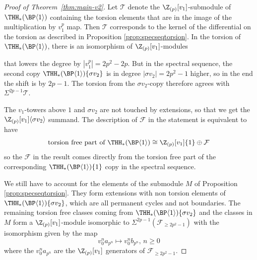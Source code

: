 \begin{proof}[Proof of Theorem~\ref{thm:main-v2}]
Let $\mathcal{T}$ denote the $\Z_{(p)}[v_1]$-submodule of $\THH_*(\BP \langle 1 \rangle)$ containing the torsion elements that are in the image of the multiplication by $v_1^p$ map. Then $\mathcal{T}$ corresponds to the kernel of the differential on the torsion as described in Proposition \ref{prop:specseqtorsion}. In the torsion of $\THH_*(\BP \langle 1 \rangle)$, there is an isomorphism of $\Z_{(p)}[v_1]$-modules
  \begin{center}
  \end{center}
  that lowers the degree by $|v_1^p| = 2p^2 - 2p$. But in the spectral sequence, the second copy $\THH_*(\BP \langle 1 \rangle)\{ \sigma v_2\}$ is in degree $|\sigma v_2| = 2p^2 - 1$ higher, so in the end the shift is by $2p -1$. The torsion from the $\sigma v_2$-copy therefore agrees with $\Sigma^{2p-1} \mathcal{T}$.

  The $v_1$-towers above $1$ and $\sigma v_2$ are not touched by extensions, so that we get the $\Z_{(p)}[v_1]\langle \sigma v_2 \rangle$ summand. The description of $\mathcal{F}$ in the statement is equivalent to have
  \[
    \text{torsion free part of } \THH_*(\BP \langle 1 \rangle) \cong \Z_{(p)}[v_1] \{1\} \oplus \mathcal{F}
  \]
  so the $\mathcal{F}$ in the result comes directly from the torsion free part of the corresponding $\THH_*(\BP \langle 1 \rangle)\{1\}$ copy in the spectral sequence.

  We still have to account for the elements of the submodule $M$ of Proposition \ref{prop:specseqtorsion}. They form extensions with non torsion elements of $\THH_*(\BP \langle 1 \rangle)\{ \sigma v_2\}$, which are all permanent cycles and not boundaries. The remaining torsion free classes coming from $\THH_*(\BP \langle 1 \rangle)\{ \sigma v_2\}$ and the classes in $M$ form a $\Z_{(p)}[v_1]$-module isomorphic to $\Sigma^{2p-1}(\mathcal{F}_{\geq 2p^2 - 1})$ with the isomorphism given by the map
  \[
    v_0^n a_{p^n} \mapsto v_0^n b_{p^n},\, n \geq 0
  \]
  where the $v_0^n a_{p^n}$ are the $\Z_{(p)}[v_1]$ generators of $\mathcal{F}_{\geq 2p^2 - 1}$.
\end{proof}


